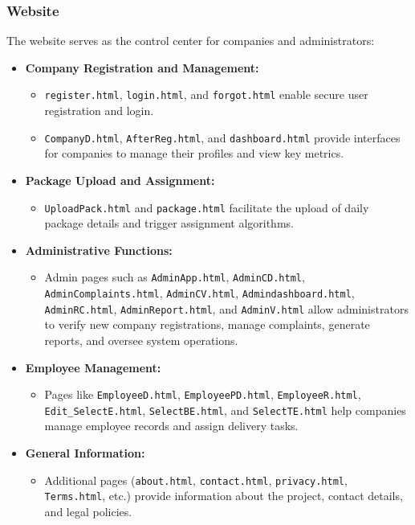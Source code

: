 \documentclass{article}
\begin{document}
\subsubsection{Website}
The website serves as the control center for companies and administrators:
\begin{itemize}
    \item \textbf{Company Registration and Management:} 
    \begin{itemize}
       \item \texttt{register.html}, \texttt{login.html}, and \texttt{forgot.html} enable secure user registration and login.
       \item \texttt{CompanyD.html}, \texttt{AfterReg.html}, and \texttt{dashboard.html} provide interfaces for companies to manage their profiles and view key metrics.
    \end{itemize}
    \item \textbf{Package Upload and Assignment:} 
    \begin{itemize}
       \item \texttt{UploadPack.html} and \texttt{package.html} facilitate the upload of daily package details and trigger assignment algorithms.
    \end{itemize}
    \item \textbf{Administrative Functions:} 
    \begin{itemize}
       \item Admin pages such as \texttt{AdminApp.html}, \texttt{AdminCD.html}, \texttt{AdminComplaints.html}, \texttt{AdminCV.html}, \texttt{Admindashboard.html}, \texttt{AdminRC.html}, \texttt{AdminReport.html}, and \texttt{AdminV.html} allow administrators to verify new company registrations, manage complaints, generate reports, and oversee system operations.
    \end{itemize}
    \item \textbf{Employee Management:} 
    \begin{itemize}
       \item Pages like \texttt{EmployeeD.html}, \texttt{EmployeePD.html}, \texttt{EmployeeR.html}, \texttt{Edit\_SelectE.html}, \texttt{SelectBE.html}, and \texttt{SelectTE.html} help companies manage employee records and assign delivery tasks.
    \end{itemize}
    \item \textbf{General Information:} 
    \begin{itemize}
       \item Additional pages (\texttt{about.html}, \texttt{contact.html}, \texttt{privacy.html}, \texttt{Terms.html}, etc.) provide information about the project, contact details, and legal policies.
    \end{itemize}
\end{itemize}
\end{document}
